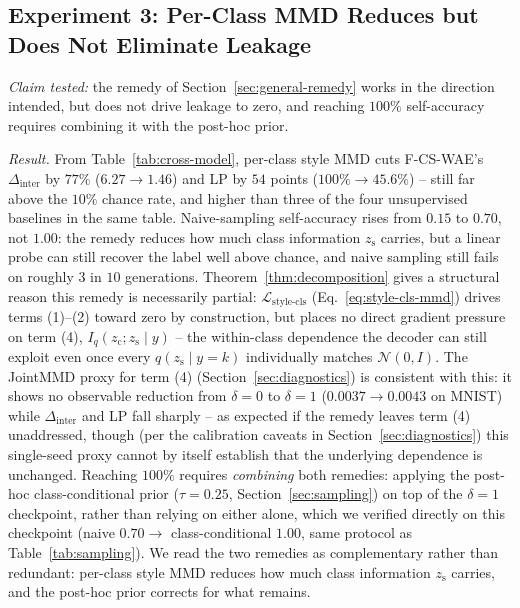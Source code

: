 \documentclass[10pt,letterpaper]{article}
\newcommand{\ours}{F-CS-WAE}
\newcommand{\zc}{z_{\mathrm{c}}}
\newcommand{\zs}{z_{\mathrm{s}}}
\begin{document}
\subsection{Experiment 3: Per-Class MMD Reduces but Does Not Eliminate Leakage}
\label{sec:exp3}

\emph{Claim tested:} the remedy of Section~\ref{sec:general-remedy} works in
the direction intended, but does not drive leakage to zero, and reaching
$100\%$ self-accuracy requires combining it with the post-hoc prior.

\emph{Result.} From Table~\ref{tab:cross-model}, per-class style MMD cuts
\ours{}'s $\Delta_{\mathrm{inter}}$ by $77\%$ ($6.27\to1.46$) and LP by $54$
points ($100\%\to45.6\%$) -- still far above the $10\%$ chance rate, and
higher than three of the four unsupervised baselines in the same table.
Naive-sampling self-accuracy rises from $0.15$ to $0.70$, not $1.00$: the
remedy reduces how much class information $\zs$ carries, but a linear probe
can still recover the label well above chance, and naive sampling still
fails on roughly $3$ in $10$ generations. Theorem~\ref{thm:decomposition}
gives a structural reason this remedy is necessarily partial:
$\mathcal L_{\mathrm{style\text{-}cls}}$ (Eq.~\ref{eq:style-cls-mmd})
drives terms (1)--(2) toward zero by construction, but places no direct
gradient pressure on term (4), $I_q(\zc;\zs\mid y)$ -- the within-class
dependence the decoder can still exploit even once every $q(\zs\mid
y{=}k)$ individually matches $\mathcal N(0,I)$. The JointMMD proxy for term
(4) (Section~\ref{sec:diagnostics}) is consistent with this: it shows no
observable reduction from $\delta{=}0$ to $\delta{=}1$ ($0.0037\to0.0043$ on
MNIST) while $\Delta_{\mathrm{inter}}$ and LP fall sharply -- as expected if
the remedy leaves term (4) unaddressed, though (per the calibration caveats
in Section~\ref{sec:diagnostics}) this single-seed proxy cannot by itself
establish that the underlying dependence is unchanged. Reaching $100\%$
requires
\emph{combining} both remedies: applying the post-hoc class-conditional
prior ($\tau{=}0.25$, Section~\ref{sec:sampling}) on top of the $\delta{=}1$
checkpoint, rather than relying on either alone, which we verified directly
on this checkpoint (naive $0.70\to$ class-conditional $1.00$, same protocol
as Table~\ref{tab:sampling}). We read the two remedies as complementary
rather than redundant: per-class style MMD reduces how much class
information $\zs$ carries, and the post-hoc prior corrects for what
remains.
\end{document}

